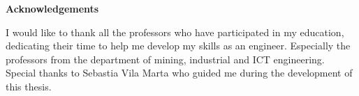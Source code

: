 \centerline{\textbf{Acknowledgements}}
I would like to thank all the professors who have participated in my education, dedicating their time to help me
develop my skills as an engineer. Especially the professors from the department of mining, industrial and ICT engineering.
Special thanks to Sebastia Vila Marta who guided me during the development of this thesis.
